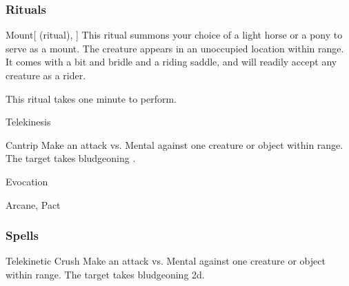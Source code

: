 \subsubsection{Rituals}


\lowercase{\hypertarget{spell:Mount}{}}\label{spell:Mount}
\begin{ability}[\nth{2}]{\hypertarget{spell:Mount}{Mount}}[ (ritual), ]
This ritual summons your choice of a light horse or a pony to serve as a mount.
The creature appears in an unoccupied location within \rngclose range.
It comes with a bit and bridle and a riding saddle, and will readily accept any creature as a rider.

This ritual takes one minute to perform.
\end{ability}
\vspace{0.25em}


\newpage
\begin{spellsection}{Telekinesis}

\begin{spellheader}
\end{spellheader}


\begin{ability}{Cantrip}
Make an attack vs. Mental against one creature or object within \rngmed range.
\hit The target takes bludgeoning .
\end{ability}




 Evocation

 Arcane, Pact
\end{spellsection}


\subsubsection{Spells}


\lowercase{\hypertarget{spell:Telekinetic Crush}{}}\label{spell:Telekinetic Crush}
\begin{ability}[\nth{1}]{\hypertarget{spell:Telekinetic Crush}{Telekinetic Crush}}
Make an attack vs. Mental against one creature or object within \rngmed range.
\hit The target takes bludgeoning  \plus2d.
\end{ability}
\vspace{0.25em}



